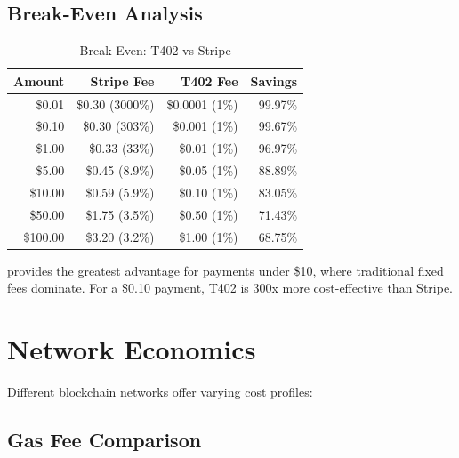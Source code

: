 \subsection{Break-Even Analysis}

\begin{table}[htbp]
\centering
\caption{Break-Even: T402 vs Stripe}
\label{tab:breakeven}
\begin{tabular}{r r r r}
\toprule
\textbf{Amount} & \textbf{Stripe Fee} & \textbf{T402 Fee} & \textbf{Savings} \\
\midrule
\$0.01 & \$0.30 (3000\%) & \$0.0001 (1\%) & 99.97\% \\
\$0.10 & \$0.30 (303\%) & \$0.001 (1\%) & 99.67\% \\
\$1.00 & \$0.33 (33\%) & \$0.01 (1\%) & 96.97\% \\
\$5.00 & \$0.45 (8.9\%) & \$0.05 (1\%) & 88.89\% \\
\$10.00 & \$0.59 (5.9\%) & \$0.10 (1\%) & 83.05\% \\
\$50.00 & \$1.75 (3.5\%) & \$0.50 (1\%) & 71.43\% \\
\$100.00 & \$3.20 (3.2\%) & \$1.00 (1\%) & 68.75\% \\
\bottomrule
\end{tabular}
\end{table}

\begin{infobox}
\tprotocol{} provides the greatest advantage for payments under \$10, where traditional fixed fees dominate. For a \$0.10 payment, T402 is 300x more cost-effective than Stripe.
\end{infobox}

\section{Network Economics}
\label{sec:network-economics}

Different blockchain networks offer varying cost profiles:

\subsection{Gas Fee Comparison}

